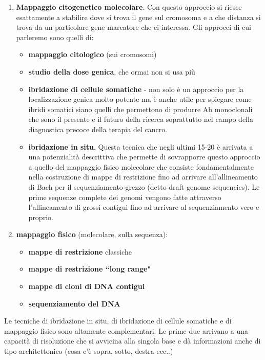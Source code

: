 \documentclass[11pt]{book}
\begin{document}
\begin{enumerate}
\item \textbf{Mappaggio citogenetico molecolare}. Con questo approccio si riesce esattamente a stabilire dove si trova il gene sul cromosoma e a che distanza si trova da un particolare gene marcatore che ci interessa. Gli approcci di cui parleremo sono quelli di: 
\begin{itemize}
\item \textbf{mappaggio citologico} (sui cromosomi)
\item \textbf{studio della dose genica}, che ormai non si usa più
\item \textbf{ibridazione di cellule somatiche} - non solo è un approccio per la localizzazione genica molto potente ma è anche utile per spiegare come ibridi somatici siano quelli che permettono di produrre Ab monoclonali che sono il presente e il futuro della ricerca soprattutto nel campo della diagnostica precoce della terapia del cancro.
\item \textbf{ibridazione in situ}. Questa tecnica che negli ultimi 15-20 è arrivata a una potenzialità descrittiva che permette di sovrapporre questo approccio a quello del mappaggio fisico molecolare che consiste fondamentalmente nella costruzione di mappe di restrizione fino ad arrivare all’allineamento di Bach per il sequenziamento grezzo (detto draft genome sequencies). Le prime sequenze complete dei genomi vengono fatte attraverso l’allineamento di grossi contigui fino ad arrivare al sequenziamento vero e proprio. 
\end{itemize}
  
\item \textbf{mappaggio fisico} (molecolare, sulla sequenza):
\begin{itemize}
\item \textbf{mappe di restrizione} classiche
\item \textbf{mappe di restrizione “long range"}
\item \textbf{mappe di cloni di DNA contigui}
\item \textbf{sequenziamento del DNA}
\end{itemize}
\end{enumerate}

Le tecniche di ibridazione in situ, di ibridazione di cellule somatiche e di mappaggio fisico sono altamente complementari. Le prime due arrivano a una capacità di risoluzione che si avvicina alla singola base e dà informazioni anche di tipo architettonico (cosa c’è sopra, sotto, destra ecc..)
\end{document}
